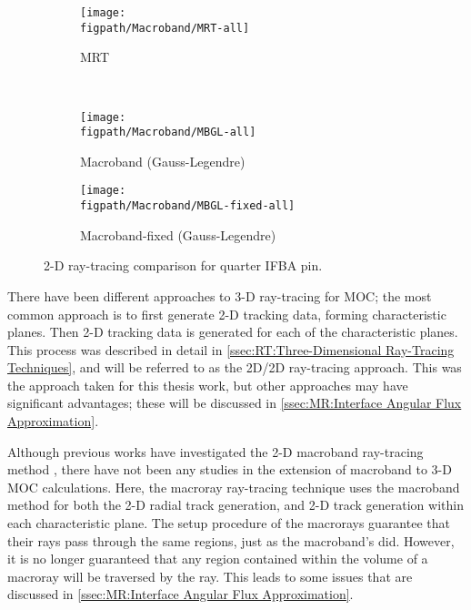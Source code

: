 {{{      \begin{figure}[htbp]
        \centering
        \begin{subfigure}[t]{0.49\textwidth}
          \centering
          \texttt{[image: \\figpath/Macroband/MRT-all]}
          \caption{MRT}
        \end{subfigure}%
        ~
        \begin{subfigure}[t]{0.49\textwidth}
          \centering
          \texttt{[image: \\figpath/Macroband/MBGL-all]}
          \caption{Macroband (Gauss-Legendre)}
        \end{subfigure}
        \begin{subfigure}[t]{0.49\textwidth}
          \centering
          \texttt{[image: \\figpath/Macroband/MBGL-fixed-all]}
          \caption{Macroband-fixed (Gauss-Legendre)}
        \end{subfigure}
        \caption{2-D ray-tracing comparison for quarter IFBA pin. \label{figs:MR:Macroband-All-Visualization}}
      \end{figure}
    }
    There have been different approaches to 3-D ray-tracing for \ac{MOC}; the most common approach is to first generate 2-D tracking data, forming characteristic planes.
    Then 2-D tracking data is generated for each of the characteristic planes.
    This process was described in detail in \cref{ssec:RT:Three-Dimensional Ray-Tracing Techniques}, and will be referred to as the 2D/2D ray-tracing approach.
    This was the approach taken for this thesis work, but other approaches may have significant advantages; these will be discussed in \cref{ssec:MR:Interface Angular Flux Approximation}.

    Although previous works have investigated the 2-D macroband ray-tracing method \cite{Yamamoto2005,Fevotte2007,Yamamoto2008}, there have not been any studies in the extension of macroband to 3-D \ac{MOC} calculations.
    Here, the macroray ray-tracing technique uses the macroband method for both the 2-D radial track generation, and 2-D track generation within each characteristic plane.
    The setup procedure of the macrorays guarantee that their rays pass through the same regions, just as the macroband's did.
    However, it is no longer guaranteed that any region contained within the volume of a macroray will be traversed by the ray.
    This leads to some issues that are discussed in \cref{ssec:MR:Interface Angular Flux Approximation}.

}}
